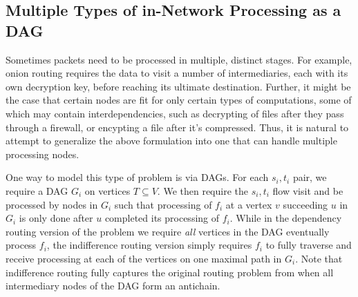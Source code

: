 \subsection{Multiple Types of in-Network Processing as a DAG}
\label{sec:dagrouting}
Sometimes packets need to be processed in multiple, distinct stages. For example, onion routing requires the data to visit a number of intermediaries, each with its own decryption key, before reaching its ultimate destination. Further, it might be the case that certain nodes are fit for only certain types of computations, some of which may contain interdependencies, such as decrypting of files after they pass through a firewall, or encypting a file after it's compressed. Thus, it is natural to attempt to generalize the above formulation into one that can handle multiple processing nodes.

One way to model this type of problem is via DAGs. For each $s_i,t_i$ pair, we require a DAG $G_i$ on vertices $T \subseteq V$. We then require the $s_i, t_i$ flow visit and be processed by nodes in $G_i$ such that processing of $f_i$ at a vertex $v$ succeeding $u$ in $G_i$ is only done after $u$ completed its processing of $f_i$. While in the dependency routing version of the problem we require \textit{all} vertices in the DAG eventually process $f_i$, the {indifference routing} version simply requires $f_i$ to fully traverse and receive processing at each of the vertices on one maximal path in $G_i$. Note that {indifference routing} fully captures the original routing problem from  when all intermediary nodes of the DAG form an antichain. 

